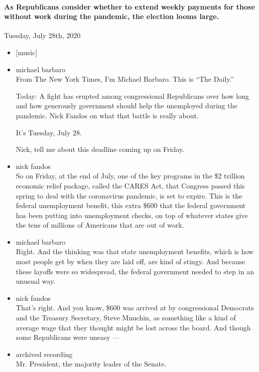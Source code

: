 \hypertarget{as-republicans-consider-whether-to-extend-weekly-payments-for-those-without-work-during-the-pandemic-the-election-looms-large}{%
\paragraph{As Republicans consider whether to extend weekly payments for
those without work during the pandemic, the election looms
large.}\label{as-republicans-consider-whether-to-extend-weekly-payments-for-those-without-work-during-the-pandemic-the-election-looms-large}}

Tuesday, July 28th, 2020

\begin{itemize}
\item
  {[}music{]}
\item
  michael barbaro\\
  From The New York Times, I'm Michael Barbaro. This is ``The Daily.''

  Today: A fight has erupted among congressional Republicans over how
  long and how generously government should help the unemployed during
  the pandemic. Nick Fandos on what that battle is really about.

  It's Tuesday, July 28.

  Nick, tell me about this deadline coming up on Friday.
\item
  nick fandos\\
  So on Friday, at the end of July, one of the key programs in the \$2
  trillion economic relief package, called the CARES Act, that Congress
  passed this spring to deal with the coronavirus pandemic, is set to
  expire. This is the federal unemployment benefit, this extra \$600
  that the federal government has been putting into unemployment checks,
  on top of whatever states give the tens of millions of Americans that
  are out of work.
\item
  michael barbaro\\
  Right. And the thinking was that state unemployment benefits, which is
  how most people get by when they are laid off, are kind of stingy. And
  because these layoffs were so widespread, the federal government
  needed to step in an unusual way.
\item
  nick fandos\\
  That's right. And you know, \$600 was arrived at by congressional
  Democrats and the Treasury Secretary, Steve Mnuchin, as something like
  a kind of average wage that they thought might be lost across the
  board. And though some Republicans were uneasy ---
\item
  archived recording\\
  Mr. President, the majority leader of the Senate.
\end{itemize}


